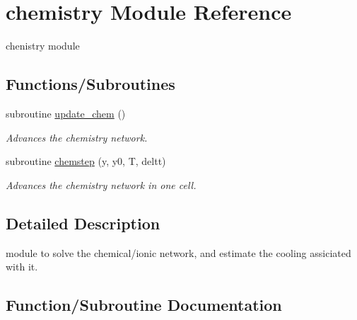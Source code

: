 \hypertarget{namespacechemistry}{}\section{chemistry Module Reference}
\label{namespacechemistry}


chenistry module  


\subsection*{Functions/\+Subroutines}
\begin{DoxyCompactItemize}
\item 
subroutine \hyperlink{namespacechemistry_a33dc05889bfc2d0361a4a3f95086f68c}{update\+\_\+chem} ()
\begin{DoxyCompactList}\small\item\em Advances the chemistry network. \end{DoxyCompactList}\item 
subroutine \hyperlink{namespacechemistry_ab808252fa02b3bfb1ac29ed7b2f5122e}{chemstep} (y, y0, T, deltt)
\begin{DoxyCompactList}\small\item\em Advances the chemistry network in one cell. \end{DoxyCompactList}\end{DoxyCompactItemize}


\subsection{Detailed Description}
module to solve the chemical/ionic network, and estimate the cooling assiciated with it. 

\subsection{Function/\+Subroutine Documentation}
\hypertarget{namespacechemistry_ab808252fa02b3bfb1ac29ed7b2f5122e}{}
